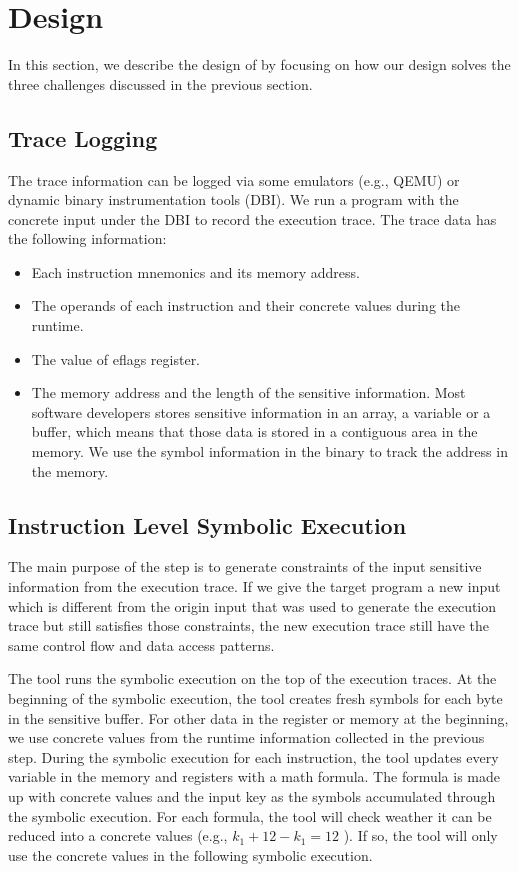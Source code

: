 \section{Design}
In this section, we describe the design of \tool{} by focusing on
how our design solves the three challenges discussed in the previous
section.

\subsection{Trace Logging}
The trace information can be logged via some emulators (e.g., QEMU) or 
dynamic binary instrumentation tools (DBI). 
We run a program with the concrete input under the DBI to record the
execution trace.
The trace data has the following information:
\begin{itemize}
    \item Each instruction mnemonics and its memory address.
    \item The operands of each instruction and their concrete values during the 
          runtime.
    \item The value of eflags register. 
    \item The memory address and the length of the sensitive information.
     Most software developers stores sensitive information in an array,
     a variable or a buffer, which means that those data is stored in a contiguous 
     area in the memory. We use the symbol information in the binary to track the 
     address in the memory.
\end{itemize}

\subsection{Instruction Level Symbolic Execution}
\label{InstructionSE}
The main purpose of the step is to generate 
constraints of the input sensitive information from the execution trace. 
If we give the target program a new input which 
is different from the origin input that was used 
to generate the execution trace but still satisfies those constraints,
the new execution trace still have the same control flow and 
data access patterns. 

The tool runs the symbolic execution on the top of the execution traces.
At the beginning of the symbolic execution, the tool creates fresh 
symbols for each byte in the sensitive buffer. For other data in the 
register or memory at the beginning, we use concrete values from the 
runtime information collected in
the previous step. During the symbolic execution for each instruction, 
the tool updates every variable in the memory and registers with a
math formula. The formula is made up with concrete values and 
the input key as the symbols accumulated through the symbolic execution.
For each formula, the tool will check weather it can be reduced
into a concrete values (e.g., $k_1+12-k_1 = 12$ ). 
If so, the tool will only use the concrete values in the 
following symbolic execution.

